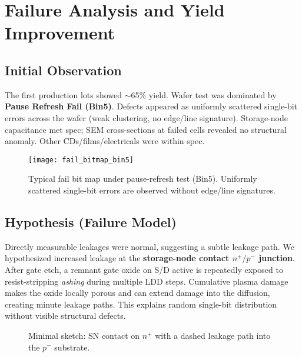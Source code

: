 \section{Failure Analysis and Yield Improvement}

\subsection{Initial Observation}
The first production lots showed $\sim$65\% yield. Wafer test was dominated by \textbf{Pause Refresh Fail (Bin5)}. Defects appeared as uniformly scattered single-bit errors across the wafer (weak clustering, no edge/line signature). Storage-node capacitance met spec; SEM cross-sections at failed cells revealed no structural anomaly. Other CDs/films/electricals were within spec.

\begin{figure}[t]
  \centering
  \texttt{[image: fail\_bitmap\_bin5]}
  \caption{Typical fail bit map under pause-refresh test (Bin5).
  Uniformly scattered single-bit errors are observed without edge/line signatures.}
  \label{fig:fail_bitmap}
\end{figure}

\subsection{Hypothesis (Failure Model)}
Directly measurable leakages were normal, suggesting a subtle leakage path. We hypothesized increased leakage at the \textbf{storage-node contact $n^+/p^-$ junction}. After gate etch, a remnant gate oxide on S/D active is repeatedly exposed to resist-stripping \emph{ashing} during multiple LDD steps. Cumulative plasma damage makes the oxide locally porous and can extend damage into the diffusion, creating minute leakage paths. This explains random single-bit distribution without visible structural defects.

\begin{figure}[t]
  \centering
  \caption{Minimal sketch: SN contact on $n^{+}$ with a dashed leakage path into the $p^{-}$ substrate.}
  \label{fig:fig2_min}
\end{figure}

